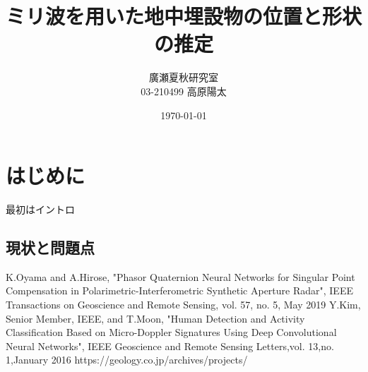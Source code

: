 \documentclass[a4paper,11pt]{jsarticle}
\begin{document}
\title{ミリ波を用いた地中埋設物の位置と形状の推定}
\author{廣瀬夏秋研究室\\03-210499 高原陽太}
\date{\today}
\maketitle

\tableofcontents


\chapter{はじめに}
最初はイントロ

\section{現状と問題点}





\begin{thebibliography}{9}

  K.Oyama and A.Hirose, "Phasor Quaternion Neural Networks for Singular
  Point Compensation in Polarimetric-Interferometric
  Synthetic Aperture Radar", IEEE Transactions on Geoscience and Remote Sensing, vol. 57, no. 5, May 2019
  Y.Kim,  Senior Member, IEEE, and T.Moon, "Human Detection and Activity Classification Based
  on Micro-Doppler Signatures Using Deep
  Convolutional Neural Networks", IEEE Geoscience and Remote Sensing Letters,vol. 13,no. 1,January 2016
  https://geology.co.jp/archives/projects/%
\end{thebibliography}
\end{document}
